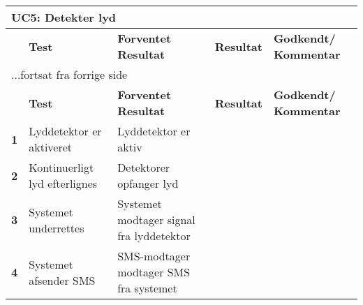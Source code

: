 
\begin{center}
\begin{longtable}{|p{}|p{}|p{}|p{}|p{}|} %
\hline
\multicolumn{5}{|l|}{\textbf{UC5: Detekter lyd}} \\ \hline
\multicolumn{1}{|c|}{} &
\textbf{Test} &
\textbf{Forventet \newline Resultat} &
\textbf{Resultat} &
\textbf{Godkendt/ \newline Kommentar} \\ \hline 
\endfirsthead

\multicolumn{5}{l}{...fortsat fra forrige side} \\ \hline 
\multicolumn{1}{|c|}{} &
\textbf{Test} &
\textbf{Forventet \newline Resultat} &
\textbf{Resultat} &
\textbf{Godkendt/ \newline Kommentar} \\ \hline 
\endhead



\textbf{1}		
&Lyddetektor er aktiveret
&Lyddetektor er aktiv	
&	
& \\\hline
\textbf{2}		
&Kontinuerligt lyd efterlignes	
&Detektorer opfanger lyd
&	
& \\\hline
\textbf{3}		
&Systemet underrettes	
&Systemet modtager signal fra lyddetektor 
&	
&  \\\hline
\textbf{4}		
&Systemet afsender SMS
&SMS-modtager modtager SMS fra systemet
& 	
& \\\hline
	\end{longtable}
	\label{ATUC5} 
\end{center}

